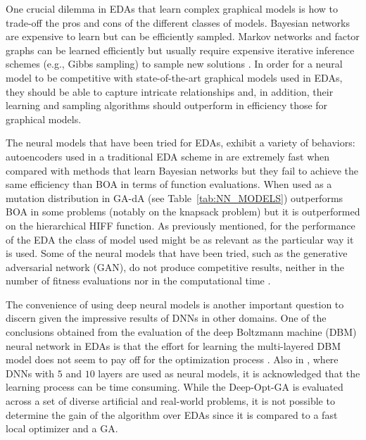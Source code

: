 \documentclass{article} %
\begin{document}



One crucial dilemma in EDAs that learn complex graphical models is how to trade-off the pros and cons of the different classes of models. Bayesian networks are expensive to learn but can be efficiently sampled. Markov networks and factor graphs can be learned efficiently but usually require expensive iterative inference schemes (e.g., Gibbs sampling) to sample new solutions \cite{Muhlenbein:2012}.  In order for a neural model to be competitive with state-of-the-art graphical models  used in EDAs, they should be able to capture intricate relationships and, in addition, their  learning and sampling algorithms should outperform in efficiency those for graphical models. 

 The neural models that have been tried for EDAs, exhibit a variety of behaviors: autoencoders  used in a traditional EDA scheme  in \cite{Probst:2015a} are extremely fast when compared with methods that learn Bayesian networks but they fail to achieve the same efficiency than BOA in terms of function evaluations.  When used as a mutation distribution in \cite{Churchill_et_al:2016} GA-dA  (see Table~\ref{tab:NN_MODELS}) outperforms BOA in some problems (notably on the knapsack problem) but it is outperformed on the hierarchical HIFF function. As previously mentioned, for the performance of the EDA the class of model used  might be as relevant as the particular way it is used. Some of the neural models that have been tried, such as the generative adversarial network (GAN),  do not produce competitive results, neither in the number of fitness evaluations nor in the computational time \cite{Probst:2015}. 

The convenience of using deep neural models is another important question to discern given the impressive results of DNNs in other domains.  One of the conclusions obtained from the evaluation of the deep Boltzmann machine (DBM) neural network in EDAs  is that the effort for learning the multi-layered DBM model does not seem to pay off for the optimization process  \cite{Probst_and_Rothlauf:2015}. Also in \cite{Baluja:2017}, where DNNs with $5$ and $10$ layers are used as neural models, it is acknowledged that the learning process can be time consuming. While the Deep-Opt-GA is evaluated across a set of diverse artificial and real-world problems, it is not possible to determine the gain of the algorithm over EDAs since it is compared to a fast local optimizer and a GA. 
\end{document}
